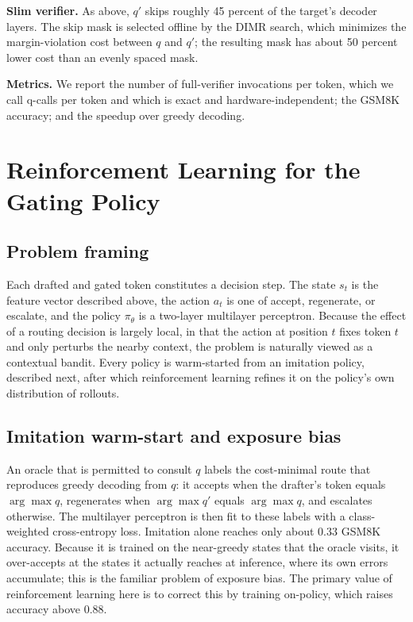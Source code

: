 \documentclass[11pt]{article}
\begin{document}
\textbf{Slim verifier.} As above, $q'$ skips roughly 45 percent of the target's decoder layers. The
skip mask is selected offline by the DIMR search, which minimizes the margin-violation cost between $q$
and $q'$; the resulting mask has about 50 percent lower cost than an evenly spaced mask.

\textbf{Metrics.} We report the number of full-verifier invocations per token, which we call q-calls
per token and which is exact and hardware-independent; the GSM8K accuracy; and the speedup over greedy
decoding.

\section{Reinforcement Learning for the Gating Policy}

\subsection{Problem framing}
Each drafted and gated token constitutes a decision step. The state $s_t$ is the feature vector
described above, the action $a_t$ is one of accept, regenerate, or escalate, and the policy
$\pi_\theta$ is a two-layer multilayer perceptron. Because the effect of a routing decision is largely
local, in that the action at position $t$ fixes token $t$ and only perturbs the nearby context, the
problem is naturally viewed as a contextual bandit. Every policy is warm-started from an imitation
policy, described next, after which reinforcement learning refines it on the policy's own distribution
of rollouts.

\subsection{Imitation warm-start and exposure bias}
An oracle that is permitted to consult $q$ labels the cost-minimal route that reproduces greedy
decoding from $q$: it accepts when the drafter's token equals $\arg\max q$, regenerates when
$\arg\max q'$ equals $\arg\max q$, and escalates otherwise. The multilayer perceptron is then fit to
these labels with a class-weighted cross-entropy loss. Imitation alone reaches only about 0.33 GSM8K
accuracy. Because it is trained on the near-greedy states that the oracle visits, it over-accepts at
the states it actually reaches at inference, where its own errors accumulate; this is the familiar
problem of exposure bias. The primary value of reinforcement learning here is to correct this by
training on-policy, which raises accuracy above 0.88.
\end{document}

